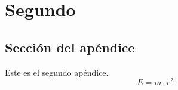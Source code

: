 \chapter{Segundo} \label{Ape2}

\section{Sección del apéndice}
Este es el segundo apéndice.
\begin{equation}
	E = m\cdot c^2
\end{equation}
